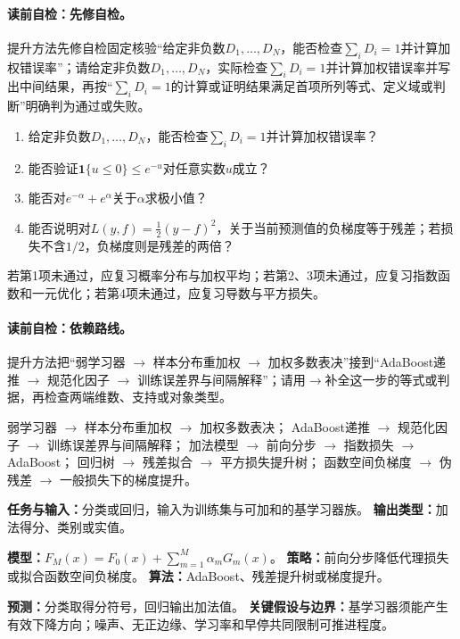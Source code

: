 \label{struct:V3-C03-CH03}
\paragraph{读前自检：先修自检。}提升方法先修自检固定核验“给定非负数$D_1,\ldots,D_N$，能否检查$\sum_iD_i=1$并计算加权错误率”；请给定非负数$D_1,\ldots,D_N$，实际检查$\sum_iD_i=1$并计算加权错误率并写出中间结果，再按“$\sum_iD_i=1$的计算或证明结果满足首项所列等式、定义域或判断”明确判为通过或失败。\par

\begin{precheckbox}
\begin{enumerate}[leftmargin=2.2em]
  \item 给定非负数$D_1,\ldots,D_N$，能否检查$\sum_iD_i=1$并计算加权错误率？
  \item 能否验证$\mathbf{1}\{u\leq0\}\leq e^{-u}$对任意实数$u$成立？
  \item 能否对$e^{-\alpha}+e^\alpha$关于$\alpha$求极小值？
  \item 能否说明对$L(y,f)=\tfrac12(y-f)^2$，关于当前预测值的负梯度等于残差；若损失不含$1/2$，负梯度则是残差的两倍？
\end{enumerate}
若第1项未通过，应复习概率分布与加权平均；若第2、3项未通过，应复习指数函数和一元优化；若第4项未通过，应复习导数与平方损失。
\end{precheckbox}

\label{struct:V3-C03-CH04}
\paragraph{读前自检：依赖路线。}提升方法把“弱学习器 $\to$ 样本分布重加权 $\to$ 加权多数表决”接到“AdaBoost递推 $\to$ 规范化因子 $\to$ 训练误差界与间隔解释”；请用$\to$补全这一步的等式或判据，再检查两端维数、支持或对象类型。\par

\begin{dependencybox}
弱学习器 $\to$ 样本分布重加权 $\to$ 加权多数表决；
AdaBoost递推 $\to$ 规范化因子 $\to$ 训练误差界与间隔解释；
加法模型 $\to$ 前向分步 $\to$ 指数损失 $\to$ AdaBoost；
回归树 $\to$ 残差拟合 $\to$ 平方损失提升树；
函数空间负梯度 $\to$ 伪残差 $\to$ 一般损失下的梯度提升。
\end{dependencybox}

\begin{keypointbox}[title=模型认识卡：提升方法]
\textbf{任务与输入：}分类或回归，输入为训练集与可加和的基学习器族。\quad
\textbf{输出类型：}加法得分、类别或实值。\par
\textbf{模型：}$F_M(x)=F_0(x)+\sum_{m=1}^M\alpha_mG_m(x)$。\quad
\textbf{策略：}前向分步降低代理损失或拟合函数空间负梯度。\quad
\textbf{算法：}AdaBoost、残差提升树或梯度提升。\par
\textbf{预测：}分类取得分符号，回归输出加法值。\quad
\textbf{关键假设与边界：}基学习器须能产生有效下降方向；噪声、无正边缘、学习率和早停共同限制可推进程度。
\end{keypointbox}

